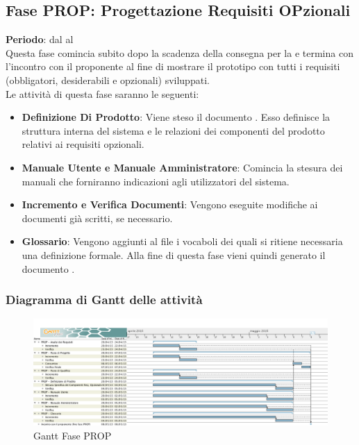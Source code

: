 \subsection{Fase PROP: Progettazione Requisiti OPzionali}
	\textbf{Periodo}: dal  al  \\Questa fase comincia subito dopo la scadenza della consegna per la  e termina con l'incontro con il proponente al fine di mostrare il prototipo con tutti i requisiti (obbligatori, desiderabili e opzionali) sviluppati. 
	\\Le attività di questa fase saranno le seguenti:
	\begin{itemize}
		\item\textbf{Definizione Di Prodotto}: Viene steso il documento . Esso definisce la struttura interna del sistema e le relazioni dei componenti del prodotto relativi ai requisiti opzionali.
		\item\textbf{Manuale Utente e Manuale Amministratore}: Comincia la stesura dei manuali che forniranno indicazioni agli utilizzatori del sistema.
		\item\textbf{Incremento e Verifica Documenti}: Vengono eseguite modifiche ai documenti già scritti, se necessario.
		\item\textbf{Glossario}: Vengono aggiunti al file  i vocaboli dei quali si ritiene necessaria una definizione formale. Alla fine di questa fase vieni quindi generato il documento .
	\end{itemize}
	\subsubsection{Diagramma di Gantt delle attività}
	\begin{figure}\centering
		\includegraphics[width=\textwidth]{PianoDiProgetto/Pics/FasePROP.png}
	\caption{Gantt Fase PROP}
\end{figure}